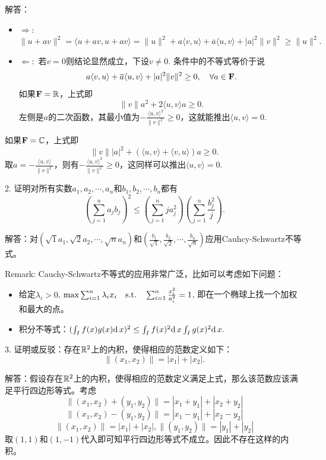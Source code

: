 \documentclass[hyperref,]{ctexart}
\providecommand{\tightlist}{%
  \setlength{\itemsep}{0pt}\setlength{\parskip}{0pt}}
\begin{document}
\noindent{}解答：

\begin{itemize}
\tightlist
\item
  \(\Rightarrow:\)
  \(\|u+av \|^2 = \langle u+av,u+av\rangle = \| u \|^2+ a\langle v,u\rangle +\overline{a}\langle u,v\rangle+ |a|^2\|v\|^2\ge \|u\|^2.\)
\item
  \(\Leftarrow:\) 若\(v=0\)则结论显然成立，下设\(v\ne 0\).
  条件中的不等式等价于说
  \[a\langle v,u\rangle +\overline{a}\langle u,v\rangle+ |a|^2\|v\|^2\ge 0,\quad \forall a \in \mathbf{F}.\]
  如果\(\mathbf{F}=\mathbb{R}\)，上式即 \[\|v\|a^2+ 2\langle u,v\rangle a\ge 0.\]
  左侧是\(a\)的二次函数，其最小值为\(-\frac{\langle u,v\rangle^2}{\|v\|^2}\ge 0\)，这就能推出\(\langle u,v\rangle =0\).
\end{itemize}

如果\(\mathbf{F} = \mathbb{C}\)，上式即
\[\|v\||a|^2+ (\langle u,v\rangle +\langle v,u\rangle)a\ge 0.\]
取\(a = -\frac{\langle u,v\rangle}{\|v\|^2}\)，则有\(-\frac{\langle u ,v\rangle^2}{\|v\|^2}\ge0\)，这同样可以推出\(\langle u,v\rangle =0\).

\bigskip

\noindent{} 2.
证明对所有实数\(a_1,a_2,\cdots,a_n\)和\(b_1,b_2,\cdots,b_n\)都有
\[\left(\sum_{j=1}^n a_jb_j\right)^2\le \left(\sum_{j=1}^nja_j^2\right)\left(\sum_{j=1}^n\frac{b_j^2}{j}\right).\]

\smallskip

\noindent{}
解答：对\((\sqrt{1}a_1,\sqrt{2}a_2,\cdots,\sqrt{n}a_n)\)和\((\frac{b_1}{\sqrt{1}},\frac{b_2}{\sqrt{2}},\cdots,\frac{b_n}{\sqrt{n}})\)应用Cauhcy-Schwartz不等式。

\smallskip

\noindent{} Remark:
Cauchy-Schwartz不等式的应用非常广泛，比如可以考虑如下问题：

\begin{itemize}
\tightlist
\item
  给定\(\lambda_i>0\),
  \(\max \sum_{i=1}^n \lambda_i x_i \quad \mathrm{s.t.} \quad \sum_{i=1}^n\frac{x_i^2}{a_i^2}=1\),
  即在一个椭球上找一个加权和最大的点。
\item
  积分不等式：\((\int_I f(x)g(x)\mathrm{d}\, x)^2\le \int_I f(x)^2\mathrm{d}\, x \int_I g(x)^2\mathrm{d}\, x.\)
\end{itemize}

\bigskip

\noindent{} 3.
证明或反驳：存在\(\mathbb{R}^2\)上的内积，使得相应的范数定义如下：
\[\|(x_1,x_2)\|=  |x_1|+|x_2|.\]

\smallskip

\noindent{}
解答：假设存在\(\mathbb{R}^2\)上的内积，使得相应的范数定义满足上式，那么该范数应该满足平行四边形等式。考虑
\[\| (x_1,x_2) +(y_1,y_2)\| = |x_1+y_1| +|x_2+y_2|\]
\[\| (x_1,x_2) -(y_1,y_2)\| = |x_1-y_1| +|x_2-y_2|\]
\[\|(x_1,x_2)\| = |x_1|+|x_2|, \|(y_1,y_2)\| = |y_1|+|y_2|\]
取\((1,1)\)和\((1,-1)\)代入即可知平行四边形等式不成立。因此不存在这样的内积。
\end{document}
